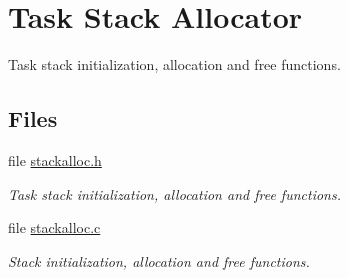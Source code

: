 \hypertarget{group__bsp__stack}{}\section{Task Stack Allocator}
\label{group__bsp__stack}


Task stack initialization, allocation and free functions.  


\subsection*{Files}
\begin{DoxyCompactItemize}
\item 
file \mbox{\hyperlink{stackalloc_8h}{stackalloc.\+h}}
\begin{DoxyCompactList}\small\item\em Task stack initialization, allocation and free functions. \end{DoxyCompactList}\item 
file \mbox{\hyperlink{stackalloc_8c}{stackalloc.\+c}}
\begin{DoxyCompactList}\small\item\em Stack initialization, allocation and free functions. \end{DoxyCompactList}\end{DoxyCompactItemize}
